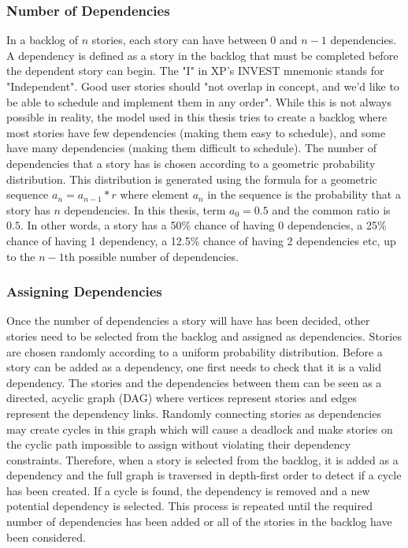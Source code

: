 \subsubsection{Number of Dependencies}
In a backlog of $n$ stories, each story can have between $0$ and $n-1$ dependencies. A dependency is defined as a story in the backlog that must be completed before the dependent story can begin. The "I" in XP's INVEST mnemonic stands for "Independent". Good user stories should "not overlap in concept, and we’d like to be able to schedule and implement them in any order". While this is not always possible in reality, the model used in this thesis tries to create a backlog where most stories have few dependencies (making them easy to schedule), and some have many dependencies (making them difficult to schedule). The number of dependencies that a story has is chosen according to a geometric probability distribution. This distribution is generated using the formula for a geometric sequence $a_n = a_{n-1}*r$ where element $a_n$ in the sequence is the probability that a story has $n$ dependencies. In this thesis, term $a_0 = 0.5$ and the common ratio is $0.5$. In other words, a story has a 50\% chance of having 0 dependencies, a 25\% chance of having 1 dependency, a 12.5\% chance of having 2 dependencies etc, up to the $n-1$th possible number of dependencies.

\subsubsection{Assigning Dependencies}
Once the number of dependencies a story will have has been decided, other stories need to be selected from the backlog and assigned as dependencies. Stories are chosen randomly according to a uniform probability distribution. Before a story can be added as a dependency, one first needs to check that it is a valid dependency. The stories and the dependencies between them can be seen as a directed, acyclic graph (DAG) where vertices represent stories and edges represent the dependency links. Randomly connecting stories as dependencies may create cycles in this graph which will cause a deadlock and make stories on the cyclic path impossible to assign without violating their dependency constraints. Therefore, when a story is selected from the backlog, it is added as a dependency and the full graph is traversed in depth-first order to detect if a cycle has been created. If a cycle is found, the dependency is removed and a new potential dependency is selected. This process is repeated until the required number of dependencies has been added or all of the stories in the backlog have been considered.


